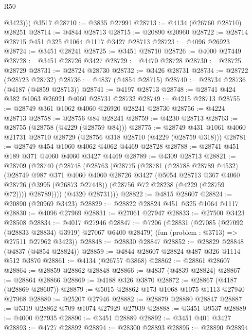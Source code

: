 \begin{lexlean}{R50}
\begin{coremodule}
          @3423)))
    @3517
@28710 := @3835 @27991
@28713 := @4134 (@26760 @28710) @28251
@28714 := @4844 @28713
@28715 := @20890 @20960
@28722 := @28714 @28715 @451 @325 @1064 @1117 @3427 @28713
@28723 := @4096 @26923
@28724 := @3451 @28241
@28725 := @3451 @28710
@28726 := @4000 @27449
@28728 := @3451 @28726 @3427
@28729 := @4470 @28728
@28730 := @28725 @28729
@28731 := @28724 @28730
@28732 := @3426 @28731
@28734 := @28722 (@28723 @28732)
@28736 := @4837 (@4854 @28715)
@28740 := @28734 @28736 (@4187 (@4859 @28713))
@28741 := @4197 @28713
@28748 := @28741 @424 @382 @1063 @26921 @4060 @28731 @28732
@28749 := @4215 @28713
@28755 := @28749 @361 @1062 @4060 @26920 @28241 @28730
@28756 := @4224 @28713
@28758 := @28756 @84 @28241
@28759 := @4230 @28713
@28763 := @28755 (@28758 (@4229 (@28759 @84)))
@28775 := @28749 @431 @1061 @4060 @21731 @28710 @28729 (@28756 @318 @28710 (@4229 (@28759 @318)))
@28781 := @28749 @454 @1060 @4062 @4062 @4469 @28728
@28788 := @28741 @451 @189 @371 @4060 @4060 @3427 @4469
@28789 := @4309 @28713
@28821 := @28709
    (@28740
      (@28748
        (@28763
          (@28775
            (@28781
              (@28788 @28789 @4532)
              (@28749
                @987
                @371
                @4060
                @4060
                @28726
                @3427
                (@5054
                  @28713
                  @367
                  @4060
                  @28726
                  (@3995 (@26873 @27448))
                  (@28756 @72 @28238 (@4229 (@28759 @72))))
                @28789))))
        (@4320 @28731)))
@28822 := @4815 @28607
@28824 := @20890 (@20969 @3423)
@28829 := @28822 @28824 @451 @325 @1064 @1117
@28830 := @4096 @27969
@28831 := @27061 @27947
@28833 := @27500 @3423 @28508
@28834 := @4017 @27946
@28847 := @7206
    (@28831
      (@27085 (@27092 (@28833 @28834) @3919) @27067 @6400 @28479)
      (fun (problem : @3713) => @27511 @27962 @3423))
@28848 := @28830 @28847
@28852 := @28829 @28848 (@4837 (@4854 @28824))
@28859 := @4844 @28607 @28824 @487 @326 @1114 @512 @3870
@28861 := @4134 (@26757 @3868)
@28862 := @28861 @28607
@28864 := @28859 @28862 @28848
@28866 := @4837 (@4839 @28824)
@28867 := @28864 @28866
@28869 := @4188 @326 @3870
@28872 := @28867 (@4187 (@28869 @28607))
@28879 := @5015 @28862 @173 @1068 @1075 @1113 @27940 @27968
@28880 := @25207 @27946
@28882 := @28879 @28880 @28847
@28887 := @5319 @28862 @709 @1074 @27929 @27939
@28888 := @3451 @9537
@28889 := @4000 @27935
@28890 := @3451 @28889
@28892 := @3451 @401 @3427
@28893 := @4727 @28892
@28894 := @28300 @28893
@28895 := @28890 @28894

\end{coremodule}
\end{lexlean}
